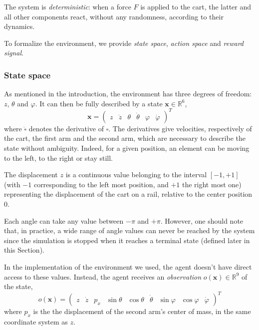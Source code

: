 \documentclass[a4paper, 12pt]{article}
\begin{document}
    The system is \emph{deterministic}: when a force $F$ is applied to the cart, the latter and all other components react, without any randomness, according to their dynamics.
    
    To formalize the environment, we provide \emph{state space}, \emph{action space} and \emph{reward signal}.
    
    \subsubsection{State space}
    
    As mentioned in the introduction, the environment has three degrees of freedom: $z$, $\theta$ and $\varphi$. It can then be fully described by a state $\bm{x}\in\mathbb{R}^6$,
    \begin{equation}
        \bm{x} = \begin{pmatrix}
            z & \dot{z} & \theta & \dot{\theta} & \varphi & \dot{\varphi}
        \end{pmatrix}^T
    \end{equation}
    where $\dot{\square}$ denotes the derivative of $\square$. The derivatives give velocities, respectively of the cart, the first arm and the second arm, which are necessary to describe the state without ambiguity. Indeed, for a given position, an element can be moving to the left, to the right or stay still.
    
    The displacement $z$ is a continuous value belonging to the interval $[-1, +1]$ (with $-1$ corresponding to the left most position, and $+1$ the right most one) representing the displacement of the cart on a rail, relative to the center position $0$.
    
    Each angle can take any value between $-\pi$ and $+\pi$. However, one should note that, in practice, a wide range of angle values can never be reached by the system since the simulation is stopped when it reaches a terminal state (defined later in this Section).
    
    In the implementation of the environment we used, the agent doesn't have direct access to these values. Instead, the agent receives an \emph{observation} $o(\bm{x}) \in \mathbb{R}^9$ of the state,
    \begin{equation}
        o(\bm{x}) = \begin{pmatrix}
            z & \dot{z} & p_x & \sin\theta & \cos\theta & \dot{\theta} & \sin\varphi & \cos\varphi & \dot{\varphi}
        \end{pmatrix}^T
    \end{equation}
    where $p_x$ is the the displacement of the second arm's center of mass, in the same coordinate system as $z$.
    
\end{document}
